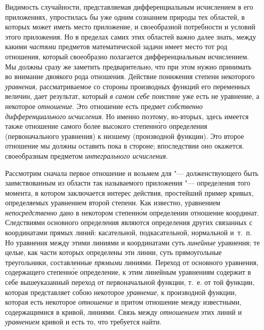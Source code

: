 Видимость случайности, представляемая дифференциальным исчислением в его
приложениях, упростилась бы уже одним сознанием природы тех областей, в
которых может иметь место приложение, и своеобразной потребности и условий
этого приложения. Но в пределах самих этих областей важно далее знать,
между какими {\em частями} предметов математической
задачи имеет место тот род отношения, который своеобразно полагается
дифференциальным исчислением. Мы должны сразу же заметить предварительно,
что при этом нужно принимать во внимание двоякого рода отношения. Действие
понижения степени некоторого {\em уравнения},
рассматриваемое со стороны производных функций его переменных величин, дает
результат, который {\em в самом себе} поистине уже есть
не уравнение, а некоторое {\em отношение}. Это
отношение есть предмет {\em собственно
дифференциального} {\em исчисления}. Но именно поэтому,
во-вторых, здесь имеется также отношение самого более высокого степенн\'{о}го
определения (первоначального уравнения) к низшему (производной функции).
Это второе отношение мы должны оставить пока в стороне; впоследствии оно
окажется. своеобразным предметом {\em интегрального исчисления}.

Рассмотрим сначала первое отношение и возьмем для "--- долженствующего быть
заимствованным из области так называемого приложения "--- определения того
момента, в котором заключается интерес действия, простейший пример кривых,
определяемых уравнением второй степени. Как известно, уравнением
{\em непосредственно} дано в некотором степенн\'{о}м
определении отношение координат. Следствиями основного определения являются
определения других связанных с координатами прямых линий: касательной,
подкасательной, нормальной и~т.~п. Но уравнения между этими линиями и
координатами суть {\em линейные} уравнения; те целые,
как части которых определены эти линии, суть прямоугольные треугольники,
составленные {\em прямыми} линиями. Переход от
основного уравнения, содержащего степенн\'{о}е определение, к этим линейным
уравнениям содержит в себе вышеуказанный переход от первоначальной
функции, т.~е. от той функции, которая представляет собою некоторое
{\em уравнение}, к производной функции, которая есть
некоторое {\em отношение} и притом отношение между
известными, содержащимися в кривой, линиями. Связь между
{\em отношением} этих линий и
{\em уравнением} кривой и есть то, что требуется найти.

